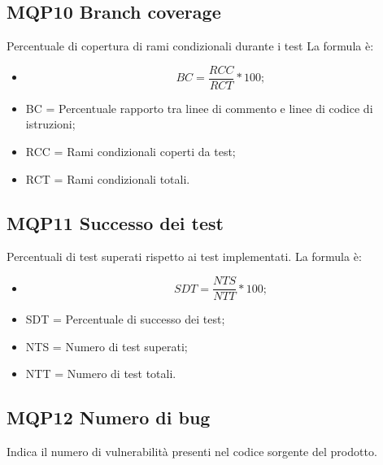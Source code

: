 \subsection{MQP10 Branch coverage}
Percentuale di copertura di rami condizionali durante i test
La formula è:
\begin{itemize}
  \item[] \[BC = \frac{RCC}{RCT} * 100 ;\]
  \item BC = Percentuale rapporto tra linee di commento e linee di codice di istruzioni;
  \item RCC = Rami condizionali coperti da test;
  \item RCT = Rami condizionali totali.
  \end{itemize}


\subsection{MQP11 Successo dei test}
Percentuali di test superati rispetto ai test implementati.
La formula è:
\begin{itemize}
  \item[] \[SDT = \frac{NTS}{NTT} * 100 ;\]
  \item SDT = Percentuale di successo dei test;
  \item NTS = Numero di test superati;
  \item NTT = Numero di test totali.
  \end{itemize}

\subsection{MQP12 Numero di bug}
Indica il numero di vulnerabilità presenti nel codice sorgente del prodotto.

